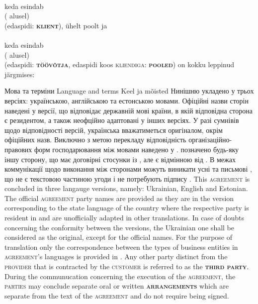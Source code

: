\begin{Form}
\begin{paracol}{3}
{          \\
          keda esindab\\
          ( alusel)\\
          (edaspidi: \textbf{\textsc{klient}}), ühelt poolt ja\\
          \\
          keda esindab\\
          ( alusel)\\
          (edaspidi: \textbf{\textsc{töövõtja}}, edaspidi koos \textsc{kliendiga}: \textbf{\textsc{pooled}}) on kokku leppinud järgmises:
        
        }
      \clause
        {Мова та терміни}
        {Language and terms}
        {Keel ja mõisted}
        {Нинішню  укладено у трьох версіях: українською, англійською та естонською мовами. Офіційні назви сторін  наведені у версії, що відповідає державній мові країни, в якій відповідна сторона є резидентом, а також неофційно адаптовані у інших версіях. У разі сумнівів щодо відповідності версій, українська вважатиметься оригіналом, окрім офіційних назв. Виключно з метою перекладу відповідність ор\-га\-ні\-за\-цій\-но-правових форм господарювання між мовами  наведено у . \textbf{} позначено будь-яку іншу сторону, що має договірні стосунки із , але є відмінною від . В межах коммунікації щодо виконання  між сторонами можуть виникати усні та письмові \textbf{}, що не є текстовою частиною угоди і не потребують підпису .
        }
        {This \textsc{agreement} is concluded in three langauge versions, na\-me\-ly: Ukrainian, English and Estonian. The official \textsc{agreement} party names are provided as they are in the version corresponding to the state language of the country where the respective party is resident in and are unofficially adapted in other translations. In case of doubts concerning the conformity between the versions, the Ukrainian one shall be considered as the original, except for the official names. For the purpose of translation only the correspondence between the types of business entities in \textsc{agreement}'s languages is provided in . Any other party distinct from the \textsc{provider} that is contracted by the \textsc{customer} is referred to as the \textbf{\textsc{third party}}. During the communucation concerning the execution of the \textsc{agreement}, the \textsc{parties} may conclude separate oral or written \textbf{\textsc{arrangements}} which are separate from the text of the \textsc{agreement} and do not require being signed.
}
\end{paracol}
\end{Form}
